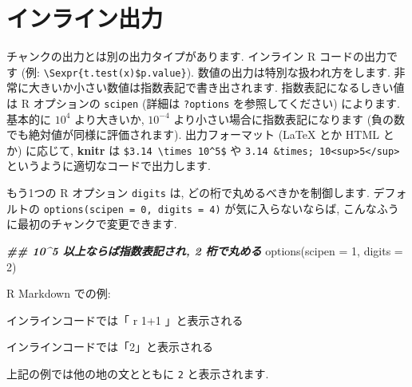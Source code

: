 \documentclass[
  xelatex,ja=standard,jafont=noto]{bxjsreport}
\newenvironment{Shaded}{\begin{snugshade}}{\end{snugshade}}
\newcommand{\AttributeTok}[1]{\textcolor[rgb]{0.77,0.63,0.00}{#1}}
\newcommand{\DecValTok}[1]{\textcolor[rgb]{0.00,0.00,0.81}{#1}}
\newcommand{\DocumentationTok}[1]{\textcolor[rgb]{0.56,0.35,0.01}{\textbf{\textit{#1}}}}
\newcommand{\FunctionTok}[1]{\textcolor[rgb]{0.00,0.00,0.00}{#1}}
\newcommand{\InformationTok}[1]{\textcolor[rgb]{0.56,0.35,0.01}{\textbf{\textit{#1}}}}
\newcommand{\NormalTok}[1]{#1}
\begin{document}
\hypertarget{ux30a4ux30f3ux30e9ux30a4ux30f3ux51faux529b}{%
\section*{インライン出力}\label{ux30a4ux30f3ux30e9ux30a4ux30f3ux51faux529b}}

チャンクの出力とは別の出力タイプがあります. インライン R
コードの出力です (例:
\texttt{\textbackslash{}Sexpr\{t.test(x)\$p.value\}}).
数値の出力は特別な扱われ方をします.
非常に大きいか小さい数値は指数表記で書き出されます.
指数表記になるしきい値は R オプションの \texttt{scipen} (詳細は
\texttt{?options} を参照してください) によります. 基本的に \(10^4\)
より大きいか, \(10^{-4}\) より小さい場合に指数表記になります
(負の数でも絶対値が同様に評価されます). 出力フォーマット (LaTeX とか
HTML とか) に応じて, \textbf{knitr} は
\texttt{\$3.14\ \textbackslash{}times\ 10\^{}5\$} や
\texttt{3.14\ \&times;\ 10\textless{}sup\textgreater{}5\textless{}/sup\textgreater{}}
というように適切なコードで出力します.

もう1つの R オプション \texttt{digits} は,
どの桁で丸めるべきかを制御します. デフォルトの
\texttt{options(scipen\ =\ 0,\ digits\ =\ 4)} が気に入らないならば,
こんなふうに最初のチャンクで変更できます.

\begin{Shaded}
\begin{Highlighting}[numbers=left,,]
\DocumentationTok{\#\# 10\^{}5 以上ならば指数表記され, 2 桁で丸める}
\FunctionTok{options}\NormalTok{(}\AttributeTok{scipen =} \DecValTok{1}\NormalTok{, }\AttributeTok{digits =} \DecValTok{2}\NormalTok{)}
\end{Highlighting}
\end{Shaded}

R Markdown での例:

\begin{Shaded}
\begin{Highlighting}[]
\NormalTok{インラインコードでは「\textasciigrave{}\textasciigrave{}}\InformationTok{\textasciigrave{} \textasciigrave{}}\NormalTok{r\textquotesingle{}\textquotesingle{} 1+1\textasciigrave{} \textasciigrave{}\textasciigrave{}\textasciigrave{}」と表示される}
\end{Highlighting}
\end{Shaded}

インラインコードでは「2」と表示される

上記の例では他の地の文とともに \texttt{2} と表示されます.
\end{document}
